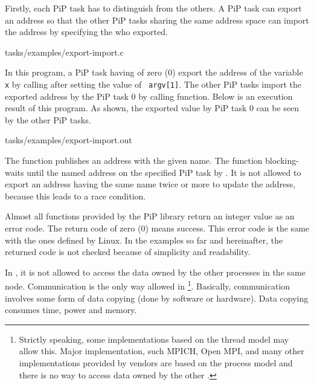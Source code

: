 Firstly, each PiP task has {\PIPID} to distinguish from the
others. A PiP task can export an address so that the other PiP tasks
sharing the same address space can import the address by
specifying the {\PIPID} who exported. 

 {tasks/examples/export-import.c}

In this program, a PiP task having {\PIPID} of zero (0) export
the address of the variable {\tt x} by calling
 after setting the value of {\tt
  argv[1]}. The 
other PiP tasks import the exported address by the PiP task 0 by
calling  function. Below is an execution
result of this program. As shown, the exported value by PiP task 0 can
be seen by the other PiP tasks. 

 {tasks/examples/export-import.out}

The  function publishes an address with
the given name. The  function
blocking-waits until the named address on the specified PiP task by
{\PIPID}. It is not allowed to export an address having the same
name twice or more to update the address, because this leads to a race
condition. 

Almost all functions provided by the PiP library return an integer
value as an error code. The return code of zero (0) means success. This
error code is the same with the ones defined by Linux. In
the examples so far and hereinafter, the returned code is not checked
because of simplicity and readability. 

In , it is not allowed to access the data owned by the other
processes in the same node. Communication is the only way allowed in
\footnote{Strictly speaking, some  implementations based on the
thread model may allow this. Major  implementation, such MPICH,
Open MPI, and many other  implementations provided by vendors are
based on the process model and there is no way to access data owned by
the other .}. Basically, communication involves some form
of data copying (done by software or hardware). Data copying consumes
time, power and memory. 

